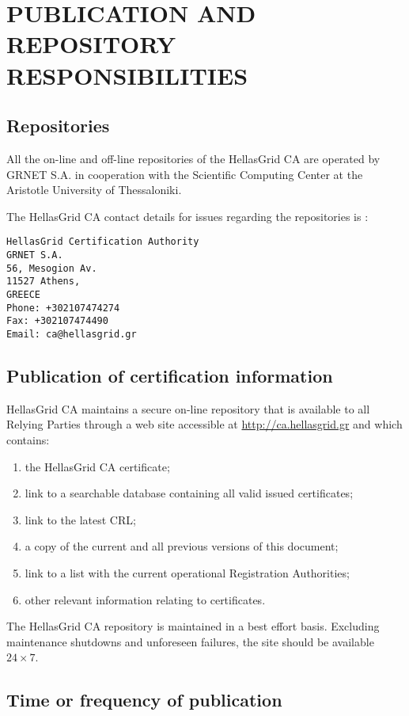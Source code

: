 
\chapter{PUBLICATION AND REPOSITORY RESPONSIBILITIES}
\section{Repositories}

All the on-line and off-line repositories of the HellasGrid CA are operated by GRNET S.A. in cooperation with the Scientific Computing Center at the Aristotle University of Thessaloniki.

The HellasGrid CA contact details for issues regarding the repositories is :

\begin{verbatim}
HellasGrid Certification Authority
GRNET S.A.
56, Mesogion Av.
11527 Athens,
GREECE
Phone: +302107474274
Fax: +302107474490
Email: ca@hellasgrid.gr
\end{verbatim}

\section{Publication of certification information}
\label{sec:PublicationOfCertificationInformation}

HellasGrid CA maintains a secure on-line repository that is available to all Relying Parties through a web site accessible at \href{http://ca.hellasgrid.gr}{http://ca.hellasgrid.gr} and which contains:

\begin{enumerate}
\item{the HellasGrid CA certificate;}
\item{link to a searchable database containing all valid issued certificates;}
\item{link to the latest CRL;}
\item{a copy of the current and all previous versions of this document;}
\item{link to a list with the current operational Registration Authorities;}
\item{other relevant information relating to certificates.}
\end{enumerate}

The HellasGrid CA repository is maintained in a best effort basis. Excluding maintenance shutdowns and unforeseen failures, the site should be available $24\times 7$.

\section{Time or frequency of publication}

